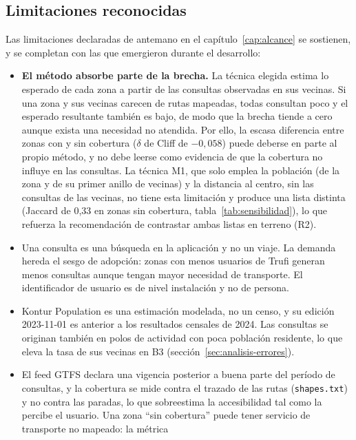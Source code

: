 \subsection{Limitaciones reconocidas}
\label{sec:limitaciones}

Las limitaciones declaradas de antemano en el capítulo~\ref{cap:alcance} se sostienen, y se
completan con las que emergieron durante el desarrollo:

\begin{itemize}
  \item \textbf{El método absorbe parte de la brecha.} La técnica elegida estima lo esperado
        de cada zona a partir de las consultas observadas en sus vecinas. Si una zona y sus
        vecinas carecen de rutas mapeadas, todas consultan poco y el esperado resultante
        también es bajo, de modo que la brecha tiende a cero aunque exista una necesidad no
        atendida. Por ello, la escasa diferencia entre zonas con y sin cobertura ($\delta$ de
        Cliff de $-0{,}058$) puede deberse en parte al propio método, y no debe leerse como
        evidencia de que la cobertura no influye en las consultas. La técnica M1, que solo
        emplea la población (de la zona y de su primer anillo de vecinas) y la distancia al
        centro, sin las consultas de las vecinas, no tiene esta limitación y produce una lista
        distinta (Jaccard de 0,33 en zonas sin cobertura,
        tabla~\ref{tab:sensibilidad}), lo que refuerza la recomendación de contrastar ambas
        listas en terreno (R2).
  \item Una consulta es una búsqueda en la aplicación y no un viaje. La demanda hereda el
        sesgo de adopción: zonas con menos usuarios de Trufi generan menos consultas aunque
        tengan mayor necesidad de transporte. El identificador de usuario es de nivel
        instalación y no de persona.
  \item Kontur Population es una estimación modelada, no un censo, y su edición 2023-11-01 es
        anterior a los resultados censales de 2024. Las consultas se originan también en
        polos de actividad con poca población residente, lo que eleva la tasa de sus vecinas
        en B3 (sección~\ref{sec:analisis-errores}).
  \item El feed GTFS declara una vigencia posterior a buena parte del período de consultas, y
        la cobertura se mide contra el trazado de las rutas (\texttt{shapes.txt}) y no contra
        las paradas, lo que sobreestima la accesibilidad tal como la percibe el usuario. Una
        zona ``sin cobertura'' puede tener servicio de transporte no mapeado: la métrica

\end{itemize}
